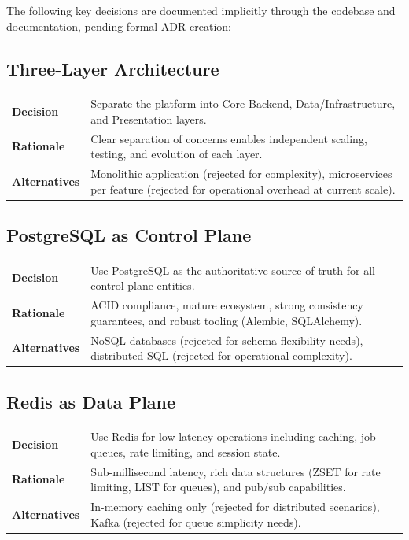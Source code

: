 \documentclass[a4paper,twoside]{sapthesis}
\begin{document}
The following key decisions are documented implicitly through the codebase and documentation, pending formal ADR creation:

\subsection{Three-Layer Architecture}

\begin{table}[ht]
\centering
\small
\begin{tabularx}{\textwidth}{lX}
    \hline
    \textbf{Decision} & Separate the platform into Core Backend, Data/Infrastructure, and Presentation layers. \\
    \textbf{Rationale} & Clear separation of concerns enables independent scaling, testing, and evolution of each layer. \\
    \textbf{Alternatives} & Monolithic application (rejected for complexity), microservices per feature (rejected for operational overhead at current scale). \\
    \hline
\end{tabularx}
\end{table}

\subsection{PostgreSQL as Control Plane}

\begin{table}[ht]
\centering
\small
\begin{tabularx}{\textwidth}{lX}
    \hline
    \textbf{Decision} & Use PostgreSQL as the authoritative source of truth for all control-plane entities. \\
    \textbf{Rationale} & ACID compliance, mature ecosystem, strong consistency guarantees, and robust tooling (Alembic, SQLAlchemy). \\
    \textbf{Alternatives} & NoSQL databases (rejected for schema flexibility needs), distributed SQL (rejected for operational complexity). \\
    \hline
\end{tabularx}
\end{table}

\subsection{Redis as Data Plane}

\begin{table}[ht]
\centering
\small
\begin{tabularx}{\textwidth}{lX}
    \hline
    \textbf{Decision} & Use Redis for low-latency operations including caching, job queues, rate limiting, and session state. \\
    \textbf{Rationale} & Sub-millisecond latency, rich data structures (ZSET for rate limiting, LIST for queues), and pub/sub capabilities. \\
    \textbf{Alternatives} & In-memory caching only (rejected for distributed scenarios), Kafka (rejected for queue simplicity needs). \\
    \hline
\end{tabularx}
\end{table}
\end{document}
